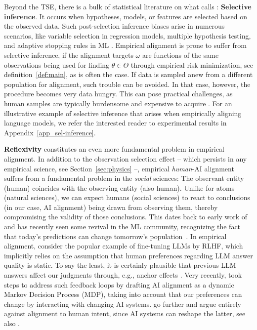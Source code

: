 \documentclass{article}
\theoremstyle{plain}
\theoremstyle{definition}
\theoremstyle{remark}
\begin{document}
 Beyond the TSE, there is a bulk of statistical literature on what \citet{Benjamini2020Selective} calls : \textbf{Selective inference}. It occurs when hypotheses, models, or features are selected based on the observed data. Such post-selection inference biases arise in numerous scenarios, like variable selection in regression models, multiple hypothesis testing, and adaptive stopping rules in ML \cite{benjamini1995controlling,wasserman2009high,fithian2014optimal,tibshirani2016exact,lee2016exact}. %
%
Empirical alignment is prone to suffer from selective inference, if the alignment targets $\omega$ are functions of the same observations being used for finding $\theta \in \Theta$ through empirical risk minimization, see definition~\ref{def:main}, as is often the case. If data is sampled anew from a different population for alignment, such trouble can be avoided. In that case, however, the procedure becomes very data hungry. This can pose practical challenges, as human samples are typically burdensome and expensive to acquire \cite{shinn2024reflexion}.
For an illustrative example of selective inference that arises when empirically aligning language models, we refer the interested reader to experimental results in Appendix~\ref{app_sel-inference}.  


\textbf{Reflexivity} constitutes an even more fundamental problem in empirical alignment. In addition to the observation selection effect -- which persists in any empirical science, see Section~\ref{sec:physics} --, empirical \textit{human}-AI alignment suffers from a fundamental problem in the \textit{social} sciences: The observant entity (human) coincides with the observing entity (also human). Unlike for atoms (natural sciences), we can expect humans (social sciences) to react to conclusions (in our case, AI alignment) being drawn from observing them, thereby compromising the validity of those conclusions. 
This  \cite{soros2015alchemy} dates back to early work of \citet{morgenstern1928wirtschaftsprognose} and has recently seen some revival in the ML community, recognizing the fact that today's predictions can change tomorrow's population~\cite{perdomo2020performative,hardt2023performative,mendler2020stochastic,miller2021outside}.
In empirical alignment, consider the popular example of fine-tuning LLMs by RLHF, which implicitly relies on the  \cite{carroll2024ai} assumption that human preferences regarding LLM answer quality is static. To say the least, it is certainly plausible that previous LLM answers affect our judgments through, e.g., anchor effects \cite{lieder2018anchoring}. Very recently, \citet{carroll2024ai} took steps to address such feedback loops by drafting AI alignment as a dynamic Markov Decision Process (MDP), taking into account that our preferences can change by interacting with changing AI systems. \citet{mitelut2023intent} go further and argue entirely against alignment to human intent, since AI systems can reshape the latter, see also \citet{gabriel2020artificial}.
\end{document}
